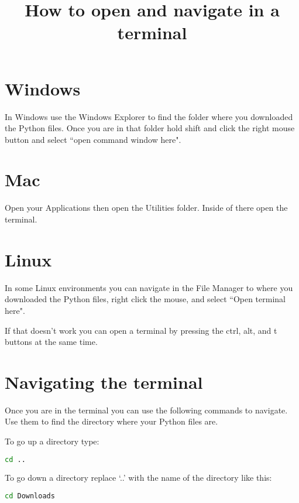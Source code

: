 \documentclass{article}
\begin{document}
\title{How to open and navigate in a terminal}

\maketitle

\section{Windows}
In Windows use the Windows Explorer to find the folder where you downloaded the Python files. Once you are in that folder hold shift and click the right mouse button and select ``open command window here". 

\section{Mac}
Open your Applications then open the Utilities folder. Inside of there open the terminal.


\section{Linux}
In some Linux environments you can navigate in the File Manager to where you downloaded the Python files, right click the mouse, and select ``Open terminal here".

If that doesn't work you can open a terminal by pressing the ctrl, alt, and t buttons at the same time. 


\section{Navigating the terminal}
Once you are in the terminal you can use the following commands to navigate. Use them to find the directory where your Python files are. 

To go up a directory type:
\begin{center}
\begin{lstlisting}[language=bash]
cd ..
\end{lstlisting}
\end{center}

To go down a directory replace `..' with the name of the directory like this:
\begin{center}
\begin{lstlisting}[language=bash]
cd Downloads
\end{lstlisting}
\end{center}
\end{document}
